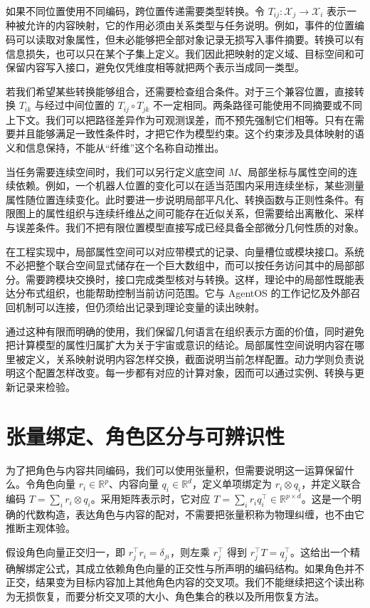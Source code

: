 如果不同位置使用不同编码，跨位置传递需要类型转换。令 $T_{ij}:\mathcal X_j\to\mathcal X_i$ 表示一种被允许的内容映射，它的作用必须由关系类型与任务说明。例如，事件的位置编码可以读取对象属性，但未必能够把全部对象记录无损写入事件摘要。转换可以有信息损失，也可以只在某个子集上定义。我们因此把映射的定义域、目标空间和可保留内容写入接口，避免仅凭维度相等就把两个表示当成同一类型。

若我们希望某些转换能够组合，还需要检查组合条件。对于三个兼容位置，直接转换 $T_{ik}$ 与经过中间位置的 $T_{ij}\circ T_{jk}$ 不一定相同。两条路径可能使用不同摘要或不同上下文。我们可以把路径差异作为可观测误差，而不预先强制它们相等。只有在需要并且能够满足一致性条件时，才把它作为模型约束。这个约束涉及具体映射的语义和信息保持，不能从“纤维”这个名称自动推出。

当任务需要连续空间时，我们可以另行定义底空间 $M$、局部坐标与属性空间的连续依赖。例如，一个机器人位置的变化可以在适当范围内采用连续坐标，某些测量属性随位置连续变化。此时要进一步说明局部平凡化、转换函数与正则性条件。有限图上的属性组织与连续纤维丛之间可能存在近似关系，但需要给出离散化、采样与误差条件。我们不把有限位置模型直接写成已经具备全部微分几何性质的对象。

在工程实现中，局部属性空间可以对应带模式的记录、向量槽位或模块接口。系统不必把整个联合空间显式储存在一个巨大数组中，而可以按任务访问其中的局部部分。需要跨模块交换时，接口完成类型核对与转换。这样，理论中的局部性既能表达分布式组织，也能帮助控制当前访问范围。它与 AgentOS 的工作记忆及外部召回机制可以连接，但仍须给出记录到理论变量的读出映射。

通过这种有限而明确的使用，我们保留几何语言在组织表示方面的价值，同时避免把计算模型的属性归属扩大为关于宇宙或意识的结论。局部属性空间说明内容在哪里被定义，关系映射说明内容怎样交换，截面说明当前怎样配置。动力学则负责说明这个配置怎样改变。每一步都有对应的计算对象，因而可以通过实例、转换与更新记录来检验。

\section{张量绑定、角色区分与可辨识性}

为了把角色与内容共同编码，我们可以使用张量积，但需要说明这一运算保留什么。令角色向量 $r_i\in\mathbb R^p$、内容向量 $q_i\in\mathbb R^d$，定义单项绑定为 $r_i\otimes q_i$，并定义联合编码 $T=\sum_i r_i\otimes q_i$。采用矩阵表示时，它对应 $T=\sum_i r_iq_i^\top\in\mathbb R^{p\times d}$。这是一个明确的代数构造，表达角色与内容的配对，不需要把张量积称为物理纠缠，也不由它推断主观体验。

假设角色向量正交归一，即 $r_j^\top r_i=\delta_{ji}$，则左乘 $r_j^\top$ 得到 $r_j^\top T=q_j^\top$。这给出一个精确解绑定公式，其成立依赖角色向量的正交性与所声明的编码结构。如果角色并不正交，结果变为目标内容加上其他角色内容的交叉项。我们不能继续把这个读出称为无损恢复，而要分析交叉项的大小、角色集合的秩以及所用恢复方法。

